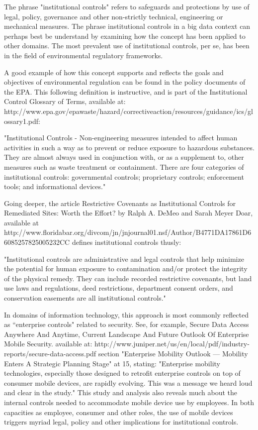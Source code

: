 The phrase "institutional controls" refers to safeguards and protections by use of legal, policy, governance and other non-strictly technical, engineering or mechanical measures.
The phrase institutional controls in a big data context can perhaps best be understand by examining how the concept has been applied to other domains.
The most prevalent use of institutional controls, per se, has been in the field of environmental regulatory frameworks.

A good example of how this concept supports and reflects the goals and objectives of environmental regulation can be found in the policy documents of the EPA.
This following definition is instructive, and is part of the Institutional Control Glossary of Terms, available at: http://www.epa.gov/epawaste/hazard/correctiveaction/resources/guidance/ics/glossary1.pdf:

"Institutional Controls - Non-engineering measures intended to affect human activities in such a way as to prevent or reduce exposure to hazardous substances. They are almost always used in conjunction with, or as a supplement to, other measures such as waste treatment or containment. There are four categories of institutional controls: governmental controls; proprietary controls; enforcement tools; and informational devices."

Going deeper, the article Restrictive Covenants as Institutional Controls for Remediated Sites: Worth the Effort? by Ralph A. DeMeo and Sarah Meyer Doar, available at http://www.floridabar.org/divcom/jn/jnjournal01.nsf/Author/B4771DA17861D66085257825005232CC defines institutional controls thusly:

"Institutional controls are administrative and legal controls that help minimize the potential for human exposure to contamination and/or protect the integrity of the physical remedy. They can include recorded restrictive covenants, but land use laws and regulations, deed restrictions, department consent orders, and conservation easements are all institutional controls."

In domains of information technology, this approach is most commonly reflected as “enterprise controls" related to security.
See, for example, Secure Data Access Anywhere And Anytime, Current Landscape And Future Outlook Of Enterprise Mobile Security. available at: http://www.juniper.net/us/en/local/pdf/industry-reports/secure-data-access.pdf section "Enterprise Mobility Outlook — Mobility Enters A Strategic Planning Stage" at 15, stating: "Enterprise mobility technologies, especially those designed to retrofit enterprise controls on top of consumer mobile devices, are rapidly evolving. This was a message we heard loud and clear in the study."
This study and analysis also reveals much about the internal controls needed to accommodate mobile device use by employees.
In both capacities as employee, consumer and other roles, the use of mobile devices triggers myriad legal, policy and other implications for institutional controls.

